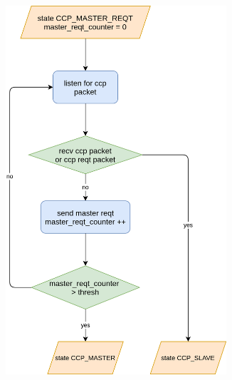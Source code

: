 \documentclass[\main/thesis.tex]{subfiles}
\begin{document}


\begin{figure}
    \centering
    \begin{subfigure}[b]{0.47\textwidth}
        \begin{center}
            \includegraphics[width=0.9\textwidth]{ccp_master_reqt_flow_chart.png}

\end{center}
\end{subfigure}
\end{figure}
\end{document}

